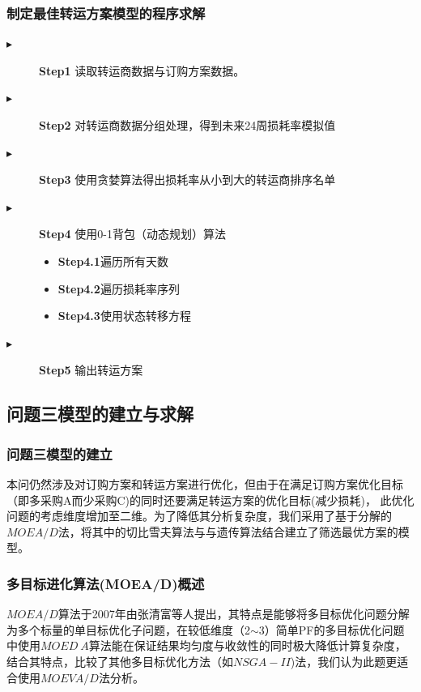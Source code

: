 \documentclass{cumcmthesis}
\begin{document}
\subsubsection*{制定最佳转运方案模型的程序求解}
\begin{description}
    \item[$\blacktriangleright$] \textbf{Step1} 读取转运商数据与订购方案数据。
    \item[$\blacktriangleright$] \textbf{Step2} 对转运商数据分组处理，得到未来24周损耗率模拟值
    \item[$\blacktriangleright$] \textbf{Step3} 使用贪婪算法得出损耗率从小到大的转运商排序名单
    \item[$\blacktriangleright$] \textbf{Step4} 使用0-1背包（动态规划）算法
        \begin{itemize}
            \item \textbf{Step4.1}遍历所有天数
            \item \textbf{Step4.2}遍历损耗率序列
            \item \textbf{Step4.3}使用状态转移方程
        \end{itemize}
    \item[$\blacktriangleright$] \textbf{Step5} 输出转运方案
\end{description}



\subsection{问题三模型的建立与求解}
\subsubsection{问题三模型的建立}
本问仍然涉及对订购方案和转运方案进行优化，但由于在满足订购方案优化目标（即多采购A而少采购C)的同时还要满足转运方案的优化目标(减少损耗)，
此优化问题的考虑维度增加至二维。为了降低其分析复杂度，我们采用了基于分解的$MOEA/D$法，将其中的切比雪夫算法与与遗传算法结合建立了筛选最优方案的模型。

\subsubsection*{多目标进化算法(MOEA/D)概述}
$MOEA/D$算法于2007年由张清富等人提出，其特点是能够将多目标优化问题分解为多个标量的单目标优化子问题，在较低维度（2$\sim$3）简单PF的多目标优化问题中使用$MOED \ A$算法能在保证结果均匀度与收敛性的同时极大降低计算复杂度，
结合其特点，比较了其他多目标优化方法（如$NSGA-II$)法，我们认为此题更适合使用$MOEVA/D$法分析。
\end{document}
